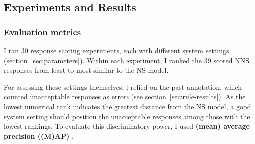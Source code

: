 \subsection{Experiments and Results}
\label{sec:metrics}
\subsubsection{Evaluation metrics}

I ran 30 response scoring experiments, each with different system settings
(section~\ref{sec:parameters}). Within each experiment, I ranked the 39
scored NNS responses from least to most similar to the NS model.

For assessing these settings themselves, I relied on the past annotation, which counted unacceptable responses as errors (see section~\ref{sec:rule-results}).  As the lowest numerical rank indicates the greatest distance from the NS model, a good system setting should position the unacceptable responses among those with the lowest rankings.
To evaluate this discriminatory power, I used \textbf{(mean) average precision ((M)AP)}
\citep[][ch. 8]{manning-et-al:08}.

